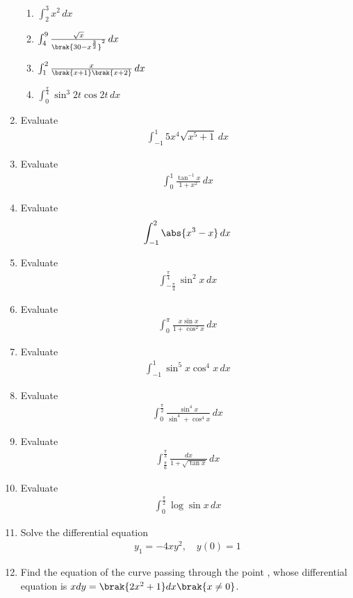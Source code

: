 \begin{enumerate}[label=\arabic*.,ref=\thesubsection.\theenumi]
\begin{enumerate}
%
\item  $\int_{2}^{3}x^2 \,dx$
\item  $\int_{4}^{9}\frac{\sqrt{x}}{\brak{30-x^{\frac{3}{2}}}^2}\,dx$
\item  $\int_{1}^{2}\frac{x}{\brak{x+1}\brak{x+2}}\,dx$
\item  $\int_{0}^{\frac{\pi}{4}}\sin^3 2t \cos 2t\,dx$
%
\end{enumerate}
%
\item Evaluate
\begin{align}
\int_{-1}^{1} 5x^4\sqrt{x^5+1}\,dx
\end{align}
%
\item Evaluate
\begin{align}
\int_{0}^{1} \frac{\tan ^{-1}x}{1+x^2}\,dx
\end{align}
%
\item Evaluate
\begin{align}
\int_{-1}^{2} \abs{x^3-x}\,dx
\end{align}
%
\item Evaluate
\begin{align}
\int_{-\frac{\pi}{4}}^{\frac{\pi}{4}}\sin^2 x\,dx
\end{align}
%
\item Evaluate
\begin{align}
\int_{0}^{\pi}\frac{x\sin x}{1+\cos^2 x}\,dx
\end{align}
%
\item Evaluate
\begin{align}
\int_{-1}^{1}\sin^5 x \cos^{4} x\,dx
\end{align}
%
\item Evaluate
\begin{align}
\int_{0}^{\frac{\pi}{2}}\frac{\sin^4 x}{\sin^4+\cos^4 x}\,dx
\end{align}
%
\item Evaluate
\begin{align}
\int_{\frac{\pi}{6}}^{\frac{\pi}{3}}\frac{dx}{1+\sqrt{\tan x}}\,dx
\end{align}
%
\item Evaluate
\begin{align}
\int_{0}^{\frac{\pi}{2}}\log \sin x \,dx
\end{align}
%
\item Solve the differential equation
%
\begin{align}
y_1  = -4xy^2, \quad y(0) = 1
\end{align}
%
\item Find the equation of the curve passing through the point , whose differential equation is $xdy =\brak{2x^2+1}dx \brak{x \ne 0}$.

\end{enumerate}
